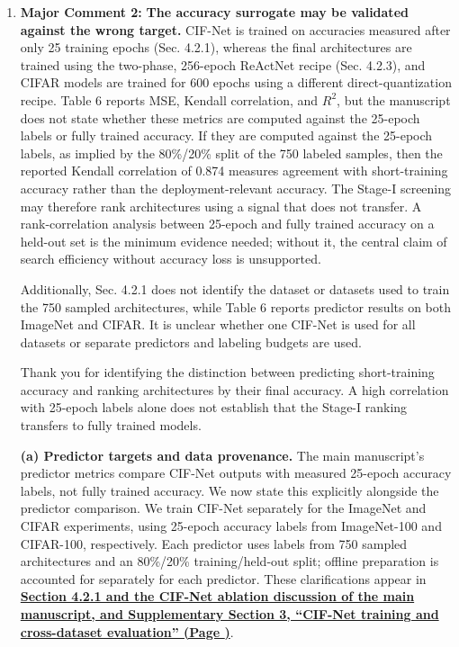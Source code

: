 \documentclass[11pt]{article}
\newcommand{\response}[1]{%
  \Needspace{3\baselineskip}%
  \par\noindent{\color{responseblue}\textbf{Response to #1:}}\par
  \vspace{1mm}\color{responseblue}}
\newcommand{\revloc}[1]{%
  \textcolor{revisionred}{\textbf{\uline{#1}}}}
\begin{document}
\begin{enumerate}[leftmargin=0pt,label={},itemsep=5mm]
\item[]\textbf{Major Comment 2:} \textbf{The accuracy surrogate may be validated against the wrong target.}
CIF-Net is trained on accuracies measured after only 25 training epochs (Sec. 4.2.1), whereas the final architectures are trained using the two-phase, 256-epoch ReActNet recipe (Sec. 4.2.3), and CIFAR models are trained for 600 epochs using a different direct-quantization recipe. Table 6 reports MSE, Kendall correlation, and $R^2$, but the manuscript does not state whether these metrics are computed against the 25-epoch labels or fully trained accuracy. If they are computed against the 25-epoch labels, as implied by the 80\%/20\% split of the 750 labeled samples, then the reported Kendall correlation of 0.874 measures agreement with short-training accuracy rather than the deployment-relevant accuracy. The Stage-I screening may therefore rank architectures using a signal that does not transfer. A rank-correlation analysis between 25-epoch and fully trained accuracy on a held-out set is the minimum evidence needed; without it, the central claim of search efficiency without accuracy loss is unsupported.

Additionally, Sec. 4.2.1 does not identify the dataset or datasets used to train the 750 sampled architectures, while Table 6 reports predictor results on both ImageNet and CIFAR. It is unclear whether one CIF-Net is used for all datasets or separate predictors and labeling budgets are used.
\response{Major Comment 2}
\begingroup
\normalfont\color{responseblue}
Thank you for identifying the distinction between predicting short-training accuracy and ranking architectures by their final accuracy. A high correlation with 25-epoch labels alone does not establish that the Stage-I ranking transfers to fully trained models.

\textbf{(a) Predictor targets and data provenance.} The main manuscript's predictor metrics compare CIF-Net outputs with measured 25-epoch accuracy labels, not fully trained accuracy. We now state this explicitly alongside the predictor comparison. We train CIF-Net separately for the ImageNet and CIFAR experiments, using 25-epoch accuracy labels from ImageNet-100 and CIFAR-100, respectively. Each predictor uses labels from 750 sampled architectures and an 80\%/20\% training/held-out split; offline preparation is accounted for separately for each predictor. These clarifications appear in \revloc{Section 4.2.1 and the CIF-Net ablation discussion of the main manuscript, and Supplementary Section 3, ``CIF-Net training and cross-dataset evaluation'' (Page \underline{\hspace{1cm}})}.


\end{enumerate}
\end{document}
